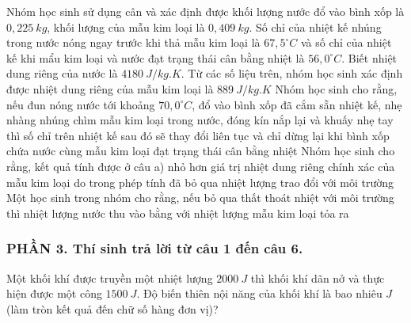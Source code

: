 \begin{ex}
{\begin{tikzpicture}[ thick]
	\end{tikzpicture}}
	\choiceTFt
	{Nhóm học sinh sử dụng cân và xác định được khối lượng nước đổ vào bình xốp là $0,225 \ kg$, khối lượng của mẫu kim loại là $0,409 \ kg$. Số chỉ của nhiệt kế nhúng trong nước nóng ngay trước khi thả mẫu kim loại là $67,5^\circ C$ và số chỉ của nhiệt kế khi mẩu kim loại và nước đạt trạng thái cân bằng nhiệt là $56, 0^\circ C$. Biết nhiệt dung riêng của nước là $4180 \ J/kg.K$. Từ các số liệu trên, nhóm học sinh xác định được nhiệt dung riêng của mẫu kim loại là $889 \ J/kg.K$}
	{\True Nhóm học sinh cho rằng, nếu đun nóng nước tới khoảng $70, 0^\circ C$, đổ vào bình xốp đã cắm sẵn nhiệt kế, nhẹ nhàng nhúng chìm mẫu kim loại trong nước, đóng kín nắp lại và khuấy nhẹ tay thì số chỉ trên nhiệt kế sau đó sẽ thay đổi liên tục và chỉ dừng lại khi bình xốp chứa nước cùng mẫu kim loại đạt trạng thái cân bằng nhiệt}
	{Nhóm học sinh cho rằng, kết quả tính được ở câu a) nhỏ hơn giá trị nhiệt dung riêng chính xác của mẫu kim loại do trong phép tính đã bỏ qua nhiệt lượng trao đổi với môi trường}
	{Một học sinh trong nhóm cho rằng, nếu bỏ qua thất thoát nhiệt với môi trường thì nhiệt lượng nước thu vào bằng với nhiệt lượng mẫu kim loại tỏa ra}
\end{ex}
\subsubsection*{PHẦN 3. Thí sinh trả lời từ câu 1 đến câu 6.}
\setcounter{ex}{0}
\begin{ex}%
	Một khối khí được truyền một nhiệt lượng $2000\ J$ thì khối khí dãn nở và thực hiện được một công $1500\ J$. Độ biến thiên nội năng của khối khí là bao nhiêu $J$ (làm tròn kết quả đến chữ số hàng đơn vị)?
\end{ex}

